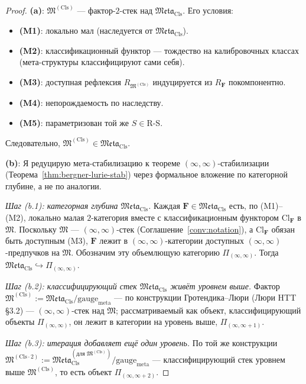 \documentclass[11pt]{article}
\theoremstyle{plain}
\theoremstyle{definition}
\newcommand{\RS}{\mathrm{R\text{-}S}}
\newcommand{\fM}{\mathfrak{M}}
\newcommand{\Meta}{\mathfrak{Meta}}
\newcommand{\Cl}{\mathrm{Cl}}
\begin{document}
\begin{proof}

\textbf{(a)}: $\fM^{(\mathrm{Cls})}$ — фактор-$2$-стек над $\Meta_{\mathrm{Cls}}$. Его условия:
\begin{itemize}
\item \textbf{(M1)}: локально мал (наследуется от $\Meta_{\mathrm{Cls}}$).
\item \textbf{(M2)}: классификационный функтор — тождество на калибровочных классах (мета-структуры классифицируют сами себя).
\item \textbf{(M3)}: доступная рефлексия $R_{\fM^{(\mathrm{Cls})}}$ индуцируется из $R_{\mathbf{F}}$ покомпонентно.
\item \textbf{(M4)}: непорождаемость по наследству.
\item \textbf{(M5)}: параметризован той же $S \in \RS$.
\end{itemize}
Следовательно, $\fM^{(\mathrm{Cls})} \in \Meta_{\mathrm{Cls}}$.

\textbf{(b)}: Я редуцирую мета-стабилизацию к теореме $(\infty, \infty)$-стабилизации (Теорема~\ref{thm:bergner-lurie-stab}) через формальное вложение по категорной глубине, а не по аналогии.

\emph{Шаг (b.1): категорная глубина $\Meta_{\mathrm{Cls}}$.} Каждая $\mathbf{F} \in \Meta_{\mathrm{Cls}}$ есть, по (M1)--(M2), локально малая $2$-категория вместе с классификационным функтором $\Cl_{\mathbf{F}}$ в $\fM$. Поскольку $\fM$ — $(\infty, \infty)$-стек (Соглашение~\ref{conv:notation}), а $\Cl_{\mathbf{F}}$ обязан быть доступным (M3), $\mathbf{F}$ лежит в $(\infty, \infty)$-категории доступных $(\infty, \infty)$-предпучков на $\fM$. Обозначим эту объемлющую категорию $\Pi_{(\infty, \infty)}$. Тогда $\Meta_{\mathrm{Cls}} \hookrightarrow \Pi_{(\infty, \infty)}$.

\emph{Шаг (b.2): классифицирующий стек $\Meta_{\mathrm{Cls}}$ живёт уровнем выше.} Фактор $\fM^{(\mathrm{Cls})} := \Meta_{\mathrm{Cls}} / \mathrm{gauge}_{\mathrm{meta}}$ — по конструкции Гротендика--Люри (Люри HTT~\cite{LurieHTT} \S 3.2) — $(\infty, \infty)$-стек над $\fM$; рассматриваемый как объект, классифицирующий объекты $\Pi_{(\infty, \infty)}$, он лежит в категории на уровень выше, $\Pi_{(\infty, \infty + 1)}$.

\emph{Шаг (b.3): итерация добавляет ещё один уровень.} По той же конструкции $\fM^{(\mathrm{Cls}\cdot 2)} := \Meta_{\mathrm{Cls}}^{(\text{для } \fM^{(\mathrm{Cls})})} / \mathrm{gauge}_{\mathrm{meta}}$ — классифицирующий стек уровнем выше $\fM^{(\mathrm{Cls})}$, то есть объект $\Pi_{(\infty, \infty + 2)}$.


\end{proof}
\end{document}
